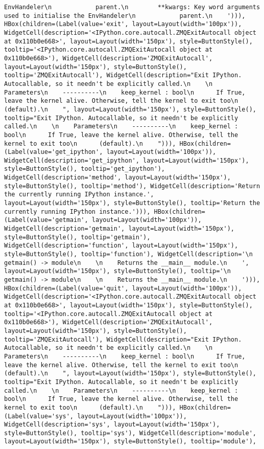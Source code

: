 \documentclass[11pt]{article}
\begin{document}
\begin{verbatim}
EnvHandeler\n            parent.\n        **kwargs: Key word arguments used to initialise the EnvHandeler\n            parent.\n    '))), HBox(children=(Label(value='exit', layout=Layout(width='100px')), WidgetCell(description='<IPython.core.autocall.ZMQExitAutocall object at 0x110b0e668>', layout=Layout(width='150px'), style=ButtonStyle(), tooltip='<IPython.core.autocall.ZMQExitAutocall object at 0x110b0e668>'), WidgetCell(description='ZMQExitAutocall', layout=Layout(width='150px'), style=ButtonStyle(), tooltip='ZMQExitAutocall'), WidgetCell(description="Exit IPython. Autocallable, so it needn't be explicitly called.\n    \n    Parameters\n    ----------\n    keep_kernel : bool\n      If True, leave the kernel alive. Otherwise, tell the kernel to exit too\n      (default).\n    ", layout=Layout(width='150px'), style=ButtonStyle(), tooltip="Exit IPython. Autocallable, so it needn't be explicitly called.\n    \n    Parameters\n    ----------\n    keep_kernel : bool\n      If True, leave the kernel alive. Otherwise, tell the kernel to exit too\n      (default).\n    "))), HBox(children=(Label(value='get_ipython', layout=Layout(width='100px')), WidgetCell(description='get_ipython', layout=Layout(width='150px'), style=ButtonStyle(), tooltip='get_ipython'), WidgetCell(description='method', layout=Layout(width='150px'), style=ButtonStyle(), tooltip='method'), WidgetCell(description='Return the currently running IPython instance.', layout=Layout(width='150px'), style=ButtonStyle(), tooltip='Return the currently running IPython instance.'))), HBox(children=(Label(value='getmain', layout=Layout(width='100px')), WidgetCell(description='getmain', layout=Layout(width='150px'), style=ButtonStyle(), tooltip='getmain'), WidgetCell(description='function', layout=Layout(width='150px'), style=ButtonStyle(), tooltip='function'), WidgetCell(description='\n    getmain() -> module\n    \n    Returns the __main__ module.\n    ', layout=Layout(width='150px'), style=ButtonStyle(), tooltip='\n    getmain() -> module\n    \n    Returns the __main__ module.\n    '))), HBox(children=(Label(value='quit', layout=Layout(width='100px')), WidgetCell(description='<IPython.core.autocall.ZMQExitAutocall object at 0x110b0e668>', layout=Layout(width='150px'), style=ButtonStyle(), tooltip='<IPython.core.autocall.ZMQExitAutocall object at 0x110b0e668>'), WidgetCell(description='ZMQExitAutocall', layout=Layout(width='150px'), style=ButtonStyle(), tooltip='ZMQExitAutocall'), WidgetCell(description="Exit IPython. Autocallable, so it needn't be explicitly called.\n    \n    Parameters\n    ----------\n    keep_kernel : bool\n      If True, leave the kernel alive. Otherwise, tell the kernel to exit too\n      (default).\n    ", layout=Layout(width='150px'), style=ButtonStyle(), tooltip="Exit IPython. Autocallable, so it needn't be explicitly called.\n    \n    Parameters\n    ----------\n    keep_kernel : bool\n      If True, leave the kernel alive. Otherwise, tell the kernel to exit too\n      (default).\n    "))), HBox(children=(Label(value='sys', layout=Layout(width='100px')), WidgetCell(description='sys', layout=Layout(width='150px'), style=ButtonStyle(), tooltip='sys'), WidgetCell(description='module', layout=Layout(width='150px'), style=ButtonStyle(), tooltip='module'), 
\end{verbatim}
\end{document}

